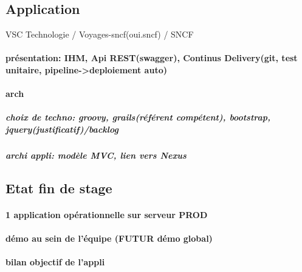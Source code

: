 \documentclass{article}
\begin{document}
\subsection{Application} VSC Technologie / Voyages-sncf(oui.sncf) / SNCF
\paragraph{présentation: IHM, Api REST(swagger), Continus Delivery(git, test unitaire, pipeline->deploiement auto)}
\paragraph{arch}
\subparagraph{choix de techno: groovy, grails(référent compétent), bootstrap, jquery(justificatif)/backlog}
\subparagraph{archi appli: modèle MVC, lien vers Nexus}

\subsection{Etat fin de stage}
\paragraph{1 application opérationnelle sur serveur PROD}
\paragraph{démo au sein de l’équipe (FUTUR démo global)}
\paragraph{bilan objectif de l’appli}
\end{document}
